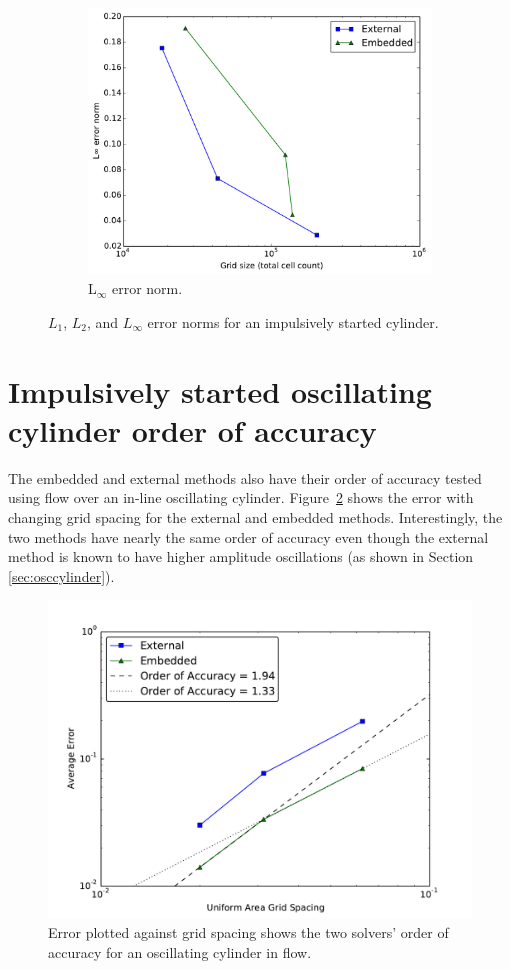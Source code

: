 \begin{figure}[H]
	\begin{subfigure}{0.5\textwidth}
		\includegraphics[width=\linewidth]{Linf_error_norm}
		\caption{L$_\infty$ error norm.}
	\end{subfigure}
	\caption{$L_1$, $L_2$, and $L_\infty$ error norms for an impulsively started cylinder.}
	\label{fig:error norm}
\end{figure}

\section{Impulsively started oscillating cylinder order of accuracy}
The embedded and external methods also have their order of accuracy tested using flow over an in-line oscillating cylinder.  
Figure~\ref{fig:oscerror} shows the error with changing grid spacing for the external and embedded methods. 
Interestingly, the two methods have nearly the same order of accuracy even though the external method is known to have higher amplitude oscillations (as shown in Section \ref{sec:osccylinder}). 

\begin{figure}[!htb]
	\centering
	\par\medskip
	\includegraphics[width=0.6\linewidth]{error_oscflow}
	\caption{Error plotted against grid spacing shows the two solvers' order of accuracy for an oscillating cylinder in flow.}
	\label{fig:oscerror}
\end{figure}

